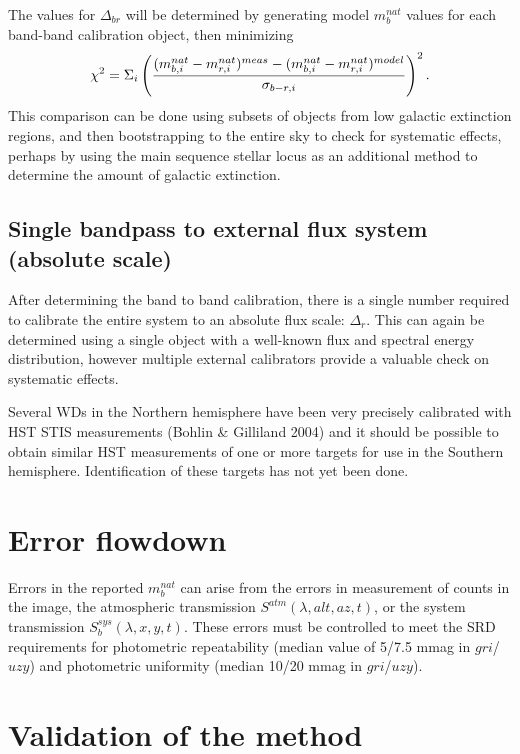 \documentclass[12pt,preprint]{aastex}
\begin{document}
The values for $\Delta_{br}$ will be determined by generating model
$m_b^{nat}$ values for each band-band calibration object, then
minimizing 
\begin{equation}
\chi^2 = \Sigma_{i} \left( { (m_{b,i}^{nat} - m_{r,i}^{nat})^{meas} - (m_{b,i}^{nat}
    - m_{r,i}^{nat})^{model} \over  \sigma_{b-r,i}}\right) ^2. 
\end{equation}
This comparison can
be done using subsets of objects from low galactic extinction regions,
and then bootstrapping to the entire sky to check for systematic
effects, perhaps by using the main sequence stellar locus as an
additional method to determine the amount of galactic extinction. 

\subsection{Single bandpass to external flux system (absolute scale)}

After determining the band to band calibration, there is a single
number required to calibrate the entire system to an absolute flux
scale: $\Delta_r$.  This can again be determined using a single
object with a well-known flux and spectral energy distribution,
however multiple external calibrators provide a valuable check on
systematic effects. 

Several WDs in the Northern hemisphere have been very precisely
calibrated with HST STIS measurements (Bohlin \& Gilliland 2004) and
it should be possible to obtain similar HST measurements of one or
more targets for use in the Southern hemisphere. Identification of
these targets has not yet been done. 

\section{Error flowdown}
\label{sec:error}

Errors in the reported $m_b^{nat}$ can arise from the errors in
measurement of counts in the image, the atmospheric transmission
$S^{atm}(\lambda,alt,az,t)$, or the system transmission
$S_b^{sys}(\lambda,x,y,t)$.  These errors must be controlled to meet
the SRD requirements for photometric repeatability (median value of
5/7.5 mmag in $gri$/$uzy$) and photometric uniformity (median 10/20
mmag in $gri$/$uzy$).





\section{Validation of the method}
\label{sec:validate}
\end{document}
